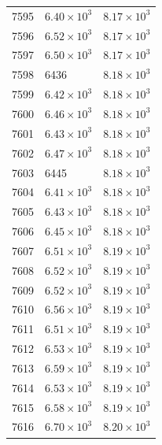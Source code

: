\begin{table}[H]
\begin{tabular}{lll}
7595 & $\displaystyle 6.40 \times 10^{3}$ & $\displaystyle 8.17 \times 10^{3}$ \\
7596 & $\displaystyle 6.52 \times 10^{3}$ & $\displaystyle 8.17 \times 10^{3}$ \\
7597 & $\displaystyle 6.50 \times 10^{3}$ & $\displaystyle 8.17 \times 10^{3}$ \\
7598 & 6436 & $\displaystyle 8.18 \times 10^{3}$ \\
7599 & $\displaystyle 6.42 \times 10^{3}$ & $\displaystyle 8.18 \times 10^{3}$ \\
7600 & $\displaystyle 6.46 \times 10^{3}$ & $\displaystyle 8.18 \times 10^{3}$ \\
7601 & $\displaystyle 6.43 \times 10^{3}$ & $\displaystyle 8.18 \times 10^{3}$ \\
7602 & $\displaystyle 6.47 \times 10^{3}$ & $\displaystyle 8.18 \times 10^{3}$ \\
7603 & 6445 & $\displaystyle 8.18 \times 10^{3}$ \\
7604 & $\displaystyle 6.41 \times 10^{3}$ & $\displaystyle 8.18 \times 10^{3}$ \\
7605 & $\displaystyle 6.43 \times 10^{3}$ & $\displaystyle 8.18 \times 10^{3}$ \\
7606 & $\displaystyle 6.45 \times 10^{3}$ & $\displaystyle 8.18 \times 10^{3}$ \\
7607 & $\displaystyle 6.51 \times 10^{3}$ & $\displaystyle 8.19 \times 10^{3}$ \\
7608 & $\displaystyle 6.52 \times 10^{3}$ & $\displaystyle 8.19 \times 10^{3}$ \\
7609 & $\displaystyle 6.52 \times 10^{3}$ & $\displaystyle 8.19 \times 10^{3}$ \\
7610 & $\displaystyle 6.56 \times 10^{3}$ & $\displaystyle 8.19 \times 10^{3}$ \\
7611 & $\displaystyle 6.51 \times 10^{3}$ & $\displaystyle 8.19 \times 10^{3}$ \\
7612 & $\displaystyle 6.53 \times 10^{3}$ & $\displaystyle 8.19 \times 10^{3}$ \\
7613 & $\displaystyle 6.59 \times 10^{3}$ & $\displaystyle 8.19 \times 10^{3}$ \\
7614 & $\displaystyle 6.53 \times 10^{3}$ & $\displaystyle 8.19 \times 10^{3}$ \\
7615 & $\displaystyle 6.58 \times 10^{3}$ & $\displaystyle 8.19 \times 10^{3}$ \\
7616 & $\displaystyle 6.70 \times 10^{3}$ & $\displaystyle 8.20 \times 10^{3}$ \\

\end{tabular}
\end{table}
